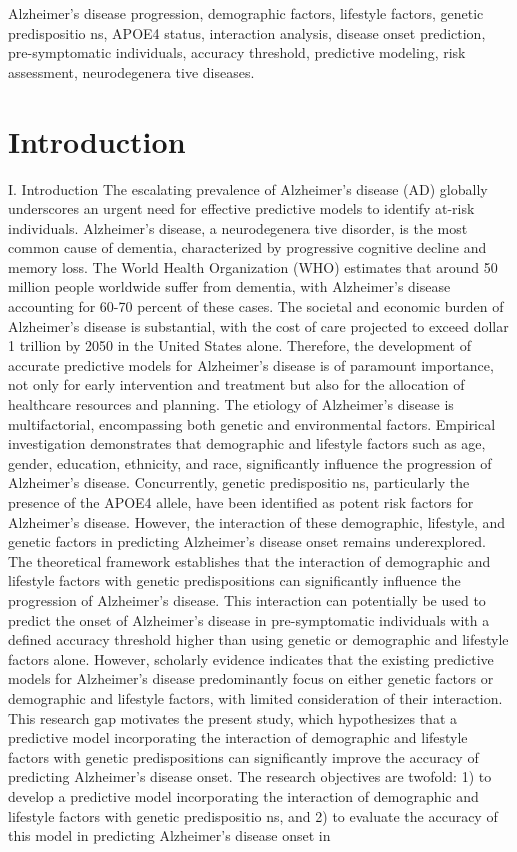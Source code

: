 \documentclass[conference]{IEEEtran}
\begin{document}
\begin{IEEEkeywords}
Alzheimer's disease progression, demographic factors, lifestyle factors, genetic predispositio ns, APOE4 status, interaction analysis, disease onset prediction, pre-symptomatic individuals, accuracy threshold, predictive modeling, risk assessment, neurodegenera tive diseases.
\end{IEEEkeywords}

\section{Introduction}
I. Introduction The escalating prevalence of Alzheimer's disease (AD) globally underscores an urgent need for effective predictive models to identify at-risk individuals. Alzheimer's disease, a neurodegenera tive disorder, is the most common cause of dementia, characterized by progressive cognitive decline and memory loss. The World Health Organization (WHO) estimates that around 50 million people worldwide suffer from dementia, with Alzheimer's disease accounting for 60-70 percent of these cases. The societal and economic burden of Alzheimer's disease is substantial, with the cost of care projected to exceed dollar 1 trillion by 2050 in the United States alone. Therefore, the development of accurate predictive models for Alzheimer's disease is of paramount importance, not only for early intervention and treatment but also for the allocation of healthcare resources and planning. The etiology of Alzheimer's disease is multifactorial, encompassing both genetic and environmental factors. Empirical investigation demonstrates that demographic and lifestyle factors such as age, gender, education, ethnicity, and race, significantly influence the progression of Alzheimer's disease. Concurrently, genetic predispositio ns, particularly the presence of the APOE4 allele, have been identified as potent risk factors for Alzheimer's disease. However, the interaction of these demographic, lifestyle, and genetic factors in predicting Alzheimer's disease onset remains underexplored. The theoretical framework establishes that the interaction of demographic and lifestyle factors with genetic predispositions can significantly influence the progression of Alzheimer's disease. This interaction can potentially be used to predict the onset of Alzheimer's disease in pre-symptomatic individuals with a defined accuracy threshold higher than using genetic or demographic and lifestyle factors alone. However, scholarly evidence indicates that the existing predictive models for Alzheimer's disease predominantly focus on either genetic factors or demographic and lifestyle factors, with limited consideration of their interaction. This research gap motivates the present study, which hypothesizes that a predictive model incorporating the interaction of demographic and lifestyle factors with genetic predispositions can significantly improve the accuracy of predicting Alzheimer's disease onset. The research objectives are twofold: 1) to develop a predictive model incorporating the interaction of demographic and lifestyle factors with genetic predispositio ns, and 2) to evaluate the accuracy of this model in predicting Alzheimer's disease onset in 
\end{document}
